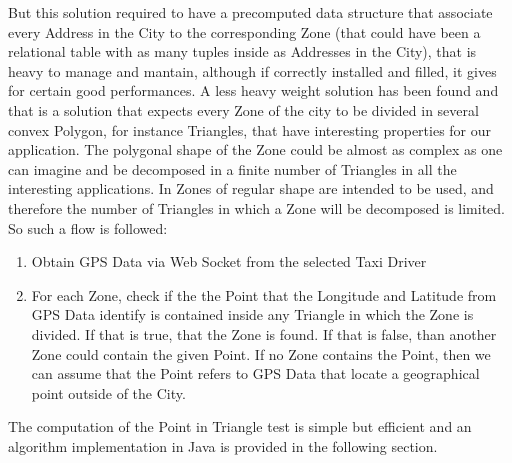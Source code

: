 But this solution required to have a precomputed data structure that associate every Address in the City to the corresponding Zone (that could have been a relational table with as many tuples inside as Addresses in the City), that is heavy to manage and mantain, although if correctly installed and filled, it gives for certain good performances.
A less heavy weight solution has been found and that is a solution that expects every Zone of the city to be divided in several convex Polygon, for instance Triangles, that have interesting properties for our application.
The polygonal shape of the Zone could be almost as complex as one can imagine and be decomposed in a finite number of Triangles in all the interesting applications.
In \myTaxiService{} Zones of regular shape are intended to be used, and therefore the number of Triangles in which a Zone will be decomposed is limited.
So such a flow is followed:
\begin{enumerate}
	\item Obtain GPS Data via Web Socket from the selected Taxi Driver
	\item For each Zone, check if the the Point that the Longitude and Latitude from GPS Data identify is contained inside any Triangle in which the Zone is divided. If that is true, that the Zone is found. If that is false, than another Zone could contain the given Point. If no Zone contains the Point, then we can assume that the Point refers to GPS Data that locate a geographical point outside of the City.
\end{enumerate}
The computation of the Point in Triangle test is simple but efficient and an algorithm implementation in Java is provided in the following section.
